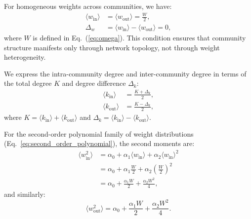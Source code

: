 \documentclass[a4paper,pre,superscriptaddress,floatfix,nofootinbib,twocolumn]{revtex4-1}
\begin{document}
For homogeneous weights across communities, we have:
\begin{align*}
\langle w_\text{in} \rangle &= \langle w_\text{out} \rangle = \frac{W}{2},\\
\Delta_{w} &= \langle w_\text{in} \rangle - \langle w_\text{out} \rangle = 0,
\end{align*}
where
$W$ is defined in Eq.~(\ref{eq:omega}).
This condition ensures that community structure manifests only through network topology, not through weight heterogeneity.

We express the intra-community degree and inter-community degree in terms of the total degree $K$ and degree difference $\Delta_k$:
\begin{align*}
\langle k_{\text{in}} \rangle &= \frac{K + \Delta_k}{2},\\
\langle k_{\text{out}} \rangle &= \frac{K - \Delta_k}{2},
\end{align*}
where $K = \langle k_{\text{in}} \rangle + \langle k_{\text{out}} \rangle$ and $\Delta_k = \langle k_{\text{in}} \rangle - \langle k_{\text{out}} \rangle$.

For the second-order polynomial family of weight distributions (Eq.~\eqref{eq:second_order_polynomial}), the second moments are:
\begin{align*}
\langle w^2_\text{in} \rangle &=
\alpha_0 + \alpha_1 \langle w_\text{in} \rangle + \alpha_2 \langle w_\text{in} \rangle^2\\
&= \alpha_0 + \alpha_1 \frac{W}{2} + \alpha_2 \left(\frac{W}{2}\right)^2\\
&= \alpha_0 + \frac{\alpha_1 W}{2} + \frac{\alpha_2 W^2}{4},
\end{align*}
and similarly:
\begin{equation*}
\langle w^2_\text{out} \rangle = \alpha_0 + \frac{\alpha_1 W}{2} + \frac{\alpha_2 W^2}{4}.
\end{equation*}
\end{document}

